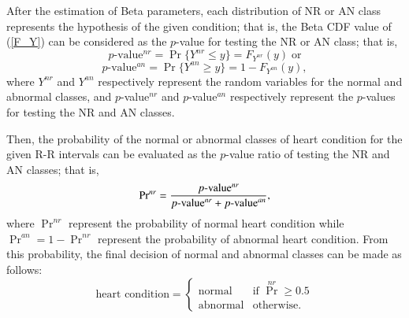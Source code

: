 \documentclass[times,twocolumn,final,authoryear]{elsarticle}
\begin{document}
After the estimation of Beta parameters, each distribution of NR or AN class represents the hypothesis of the given condition; that is,
the Beta CDF value of (\ref{F_Y}) can be considered as the $p$-value for testing the NR or AN class; that is,
\begin{equation}
\mbox{$p$-value$^{nr}$} = \Pr\{Y^{nr}\le y\}
= F_{Y^{nr}}(y) \; \mbox{or}
\end{equation}
\begin{equation}
\mbox{$p$-value$^{an}$} = \Pr\{Y^{an}\ge y\}
= 1 - F_{Y^{an}}(y),
\end{equation}
where $Y^{nr}$ and $Y^{an}$ respectively represent the random variables for the normal and abnormal classes, and
$p$-value$^{nr}$ and $p$-value$^{an}$ respectively represent the $p$-values for testing the NR and AN classes.

Then, the probability of the normal or abnormal classes of heart condition for the given R-R intervals
can be evaluated as the $p$-value ratio of  testing the NR and AN classes; that is,
\begin{equation}
\mbox{$\Pr^{nr}$} = {{\mbox{$p$-value$^{nr}$}}\over{\mbox{$p$-value$^{nr}$}+\mbox{$p$-value$^{an}$}}}, \label{p_ratio}
\end{equation}
where $\mbox{$\Pr^{nr}$}$ represent the probability of normal heart condition while $\mbox{$\Pr^{an}$}=1 - \mbox{$\Pr^{nr}$}$ 
represent the probability of abnormal heart condition.
From this probability, the final decision of normal and abnormal classes can be made as follows:
\begin{equation}
\mbox{heart condition} = \left\{ \begin{array}{ll}
                                      \mbox{normal}     & \mbox{if $\Pr^{nr} \ge 0.5$}\\
                                      \mbox{abnormal} & \mbox{otherwise.} \end{array} \right.
\end{equation}
\end{document}
